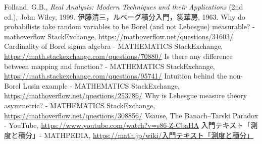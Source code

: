 \begin{thebibliography}{99}
	 Folland, G.B., \textit{Real Analysis: Modern Techniques and their Applications} (2nd ed.), John Wiley, 1999.
	 伊藤清三，ルベーグ積分入門，裳華房, 1963.
	 Why do probabilists take random variables to be Borel (and not Lebesgue) measurable? - mathoverflow StackExchange,
		\url{https://mathoverflow.net/questions/31603/}
	 Cardinality of Borel sigma algebra - MATHEMATICS StackExchange,\\
		\url{https://math.stackexchange.com/questions/70880/}
	 Is there any difference between mapping and function? - MATHEMATICS StackExchange,\\
		\url{https://math.stackexchange.com/questions/95741/}
	 Intuition behind the non-Borel Lusin example - MATHEMATICS StackExchange,\\
		\url{https://mathoverflow.net/questions/253786/}
	 Why is Lebesgue measure theory asymmetric? - MATHEMATICS StackExchange,\\
		\url{https://mathoverflow.net/questions/308856/}
	 Vsause, The Banach–Tarski Paradox - YouTube,
		\url{https://www.youtube.com/watch?v=s86-Z-CbaHA}
	 入門テキスト「測度と積分」- MATHPEDIA,
		\href{https://math.jp/wiki/%E5%85%A5%E9%96%80%E3%83%86%E3%82%AD%E3%82%B9%E3%83%88%E3%80%8C%E6%B8%AC%E5%BA%A6%E3%81%A8%E7%A9%8D%E5%88%86%E3%80%8D}{https://math.jp/wiki/入門テキスト「測度と積分」}
\end{thebibliography}

